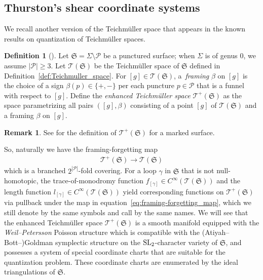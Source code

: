 \documentclass[pdftex]{sigma}
\numberwithin{equation}{section}
\theoremstyle{definition}
\newtheorem{Definition}[Theorem]{Definition}
\newtheorem{Remark}[Theorem]{Remark}
\begin{document}
\subsection{Thurston's shear coordinate systems}
\label{subsec:shear}
We recall another version of the Teichm\"uller space that appears in the known results on quantization of Teichm\"uller spaces.
\begin{Definition}[\cite{F97}]
\label{def:enhanced_Teichmuller_space}
Let $\mathfrak{S} = \Sigma\setminus \mathcal{P}$ be a punctured surface; when $\Sigma$ is of genus $0$, we assume $|\mathcal{P}|\ge 3$. Let $\mathscr{T}(\mathfrak{S})$ be the Teichm\"uller space of $\mathfrak{S}$ defined in Definition~\ref{def:Teichmuller_space}. For $[g] \in \mathscr{T}(\mathfrak{S})$, a~{\em framing} $\beta$ on $[g]$ is the choice of a sign $\beta(p) \in \{+,-\}$ per each puncture $p\in \mathcal{P}$ that is a funnel with respect to $[g]$.
Define the {\em enhanced Teichm\"uller space} $\mathscr{T}^+(\mathfrak{S})$ as the space parametrizing all pairs $([g], \beta)$ consisting of a point $[g]$ of $\mathscr{T}(\mathfrak{S})$ and a framing $\beta$ on $[g]$.
\end{Definition}
\begin{Remark}
See \cite{A16} for the definition of $\mathscr{T}^+(\mathfrak{S})$ for a marked surface.
\end{Remark}
So, naturally we have the framing-forgetting map
\begin{align}
\label{eq:framing-forgetting_map}
\mathscr{T}^+(\mathfrak{S}) \to \mathscr{T}(\mathfrak{S})
\end{align}
which is a branched $2^{|\mathcal{P}|}$-fold covering. For a loop $\gamma$ in $\mathfrak{S}$ that is not null-homotopic, the trace-of-monodromy function $f_{[\gamma]} \in C^\infty( \mathscr{T}(\mathfrak{S}))$ and the length function $l_{[\gamma]} \in C^\infty( \mathscr{T}(\mathfrak{S}))$ yield corresponding functions on $\mathscr{T}^+(\mathfrak{S})$ via pullback under the map in equation~\eqref{eq:framing-forgetting_map}, which we still denote by the same symbols and call by the same names.
We will see that the enhanced Teichm\"uller space $\mathscr{T}^+(\mathfrak{S})$ is a smooth manifold equipped with the {\it Weil--Petersson} Poisson structure which is compatible with the (Atiyah--Bott--)Goldman symplectic structure \cite{Goldman} on the ${\rm SL}_2$-character variety of $\mathfrak{S}$, and possesses a system of special coordinate charts that are suitable for the quantization problem. These coordinate charts are enumerated by the ideal triangulations of $\mathfrak{S}$.
\end{document}
